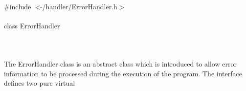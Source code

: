
   \\
\indent \#include $<\tilde{ }$/handler/ErrorHandler.h$>$  \\

  \\
\indent class ErrorHandler \\

 \\
 \\

  \\
\indent The ErrorHandler class is an abstract class which is
introduced to allow error information to be processed during the
execution of the program. The interface defines two pure virtual
